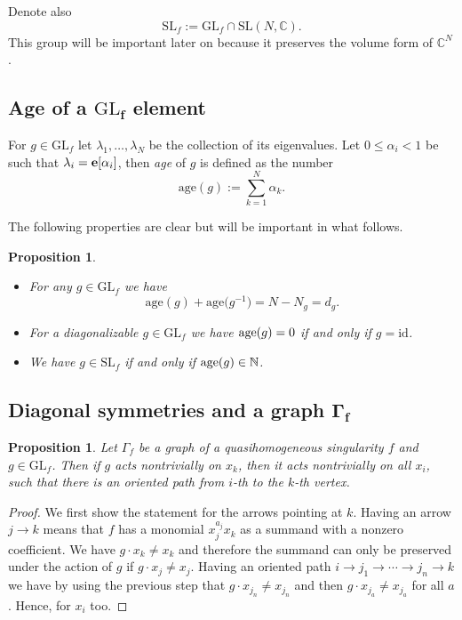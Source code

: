 \documentclass[pdftex]{sigma}
\numberwithin{equation}{section}
\newtheorem{Proposition}[Theorem]{Proposition}
 { \theoremstyle{definition}
\newtheorem{Definition}[Theorem]{Definition}
\newtheorem{Note}[Theorem]{Note}
\newtheorem{Example}[Theorem]{Example}
\newtheorem{Remark}[Theorem]{Remark} }
\newcommand{\CC}{{\mathbb{C}}}
\newcommand{\NN}{{\mathbb{N}}}
\newcommand{\SL}{{\mathrm{SL}}}
\newcommand{\GL}{{\mathrm{GL}}}
\newcommand{\epi}{{\bf e}}
\newcommand{\id}{\mathrm{id}}
\newcommand{\age}{\mathrm{age}}
\begin{document}
Denote also
\[
\SL_f:=\GL_f\cap\SL(N,\CC).
\]
This group will be important later on because it preserves the volume form of $\CC^N$.

\subsection[Age of a GL\_f element]{Age of a $\boldsymbol{\GL_f}$ element}

For $g\in \GL_f$ let $\lambda_1,\ldots,\lambda_N$ be the collection of its eigenvalues. Let $0\le \alpha_i < 1$ be such that $\lambda_i=\epi[\alpha_i]$, then {\em age} of $g$ is defined as the number
\begin{equation*}%
\age(g) := \sum_{k=1}^N \alpha_k.
\end{equation*}

The following properties are clear but will be important in what follows.

\begin{Proposition}\label{prop: integral age}\quad
\begin{itemize}\itemsep=0pt
\item[$(1)$] For any $g \in \GL_f$ we have
\begin{equation}\label{eq: age g and inverse}
		\age(g) + \age\bigl(g^{-1}\bigr) = N - N_g = d_g.
\end{equation}

\item[$(2)$] For a diagonalizable $g\in \GL_f$ we have ${\rm age}(g) = 0$ if and only if $g = \id$.

\item[$(3)$] We have $g\in \SL_f$ if and only if ${\rm age}(g)\in\NN$.
\end{itemize}
\end{Proposition}

\subsection[Diagonal symmetries and a graph Gamma\_f]{Diagonal symmetries and a graph $\boldsymbol{\Gamma_f}$}

\begin{Proposition}\label{prop: group elements on graph}
	Let $\Gamma_f$ be a graph of a quasihomogeneous singularity $f$ and $g \in \GL_f$. Then if $g$ acts nontrivially on $x_k$, then it acts nontrivially on all $x_i$, such that there is an oriented path from $i$-th to the $k$-th vertex.
\end{Proposition}
\begin{proof}
 We first show the statement for the arrows pointing at $k$.
 Having an arrow $j \to k$ means that $f$ has a monomial $x_j^{a_j}x_k$ as a summand with a nonzero coefficient. We have $g \cdot x_k \neq x_k$ and therefore the summand can only be preserved under the action of $g$ if $g\cdot x_j \neq x_j$. Having an oriented path $i \to j_1 \to \cdots \to j_n \to k$ we have by using the previous step that $g \cdot x_{j_n} \neq x_{j_n}$ and then $g \cdot x_{j_a} \neq x_{j_a}$ for all $a$. Hence, for $x_i$ too.
\end{proof}
\end{document}
